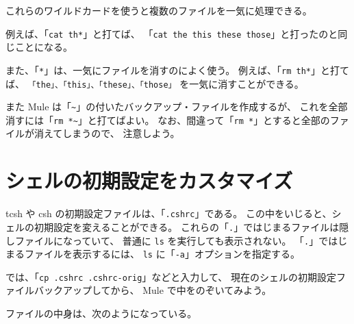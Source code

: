これらのワイルドカードを使うと複数のファイルを一気に処理できる。

\bigskip

例えば、「\texttt{cat th*}」と打てば、
「\texttt{cat the this these those}」と打ったのと同じことになる。

また、「\texttt{*}」は、一気にファイルを消すのによく使う。
例えば、「\texttt{rm th*}」と打てば、
\texttt{「the」、「this」、「these」、「those」} を一気に消すことができる。

また Mule は「\verb+~+」の付いたバックアップ・ファイルを作成するが、
これを全部消すには「\texttt{rm *\~}」と打てばよい。
なお、間違って「\texttt{rm *}」とすると全部のファイルが消えてしまうので、
注意しよう。

\section{シェルの初期設定をカスタマイズ}

tcsh や csh の初期設定ファイルは、「\texttt{.cshrc}」である。
この中をいじると、シェルの初期設定を変えることができる。
これらの「\texttt{.}」ではじまるファイルは隠しファイルになっていて、
普通に \texttt{ls} を実行しても表示されない。
「\texttt{.}」ではじまるファイルを表示するには、
 \texttt{ls} に「\texttt{-a}」オプションを指定する。


では、「\texttt{cp .cshrc .cshrc-orig}」などと入力して、
現在のシェルの初期設定ファイルバックアップしてから、
Mule で中をのぞいてみよう。

\begin{progls}
%
\end{progls}

ファイルの中身は、次のようになっている。

